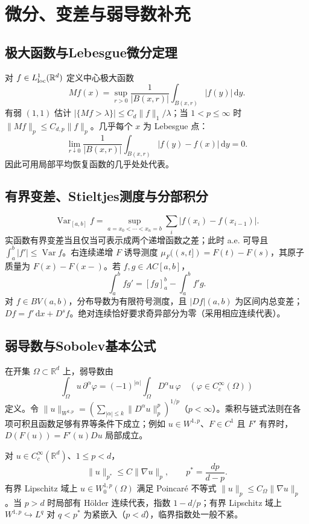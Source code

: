 \documentclass[../main.tex]{subfiles}
\begin{document}
\section{微分、变差与弱导数补充}
\subsection{极大函数与Lebesgue微分定理}
对 $f\in L^1_{\rm loc}(\mathbb R^d)$ 定义中心极大函数
\[
Mf(x)=\sup_{r>0}\frac1{|B(x,r)|}\int_{B(x,r)}|f(y)|\,\mathrm dy.
\]
有弱 $(1,1)$ 估计 $|\{Mf>\lambda\}|\le C_d\|f\|_1/\lambda$；当 $1<p\le\infty$ 时 $\|Mf\|_p\le C_{d,p}\|f\|_p$。几乎每个 $x$ 为 Lebesgue 点：
\[
\lim_{r\downarrow0}\frac1{|B(x,r)|}\int_{B(x,r)}|f(y)-f(x)|\,\mathrm dy=0.
\]
因此可用局部平均恢复函数的几乎处处代表。
\subsection{有界变差、Stieltjes测度与分部积分}
\[
\operatorname{Var}_{[a,b]}f=\sup_{a=x_0<\cdots<x_n=b}\sum_i|f(x_i)-f(x_{i-1})|.
\]
实函数有界变差当且仅当可表示成两个递增函数之差；此时 a.e. 可导且 $\int_a^b|f'|\le\operatorname{Var}f$。右连续递增 $F$ 诱导测度 $\mu_F((s,t])=F(t)-F(s)$，其原子质量为 $F(x)-F(x-)$。若 $f,g\in AC[a,b]$，
\[
\int_a^bf g'=[fg]_a^b-\int_a^bf'g.
\]
对 $f\in BV(a,b)$，分布导数为有限符号测度，且 $|Df|(a,b)$ 为区间内总变差；$Df=f'\,\mathrm dx+D^sf$。绝对连续恰好要求奇异部分为零（采用相应连续代表）。
\subsection{弱导数与Sobolev基本公式}
在开集 $\Omega\subset\mathbb R^d$ 上，弱导数由
\[
\int_\Omega u\,\partial^\alpha\varphi
=(-1)^{|\alpha|}\int_\Omega D^\alpha u\,\varphi\quad(\varphi\in C_c^\infty(\Omega))
\]
定义。令 $\|u\|_{W^{k,p}}=(\sum_{|\alpha|\le k}\|D^\alpha u\|_p^p)^{1/p}$（$p<\infty$）。乘积与链式法则在各项可积且函数足够有界等条件下成立；例如 $u\in W^{1,p}$、$F\in C^1$ 且 $F'$ 有界时，$D(F(u))=F'(u)Du$ 局部成立。

对 $u\in C_c^\infty(\mathbb R^d)$、$1\le p<d$，
\[
\|u\|_{p^*}\le C\|\nabla u\|_p,\qquad p^*=\frac{dp}{d-p}.
\]
有界 Lipschitz 域上 $u\in W_0^{1,p}(\Omega)$ 满足 Poincaré 不等式 $\|u\|_p\le C_\Omega\|\nabla u\|_p$。当 $p>d$ 时局部有 Hölder 连续代表，指数 $1-d/p$；有界 Lipschitz 域上 $W^{1,p}\hookrightarrow L^q$ 对 $q<p^*$ 为紧嵌入（$p<d$），临界指数处一般不紧。
\end{document}
